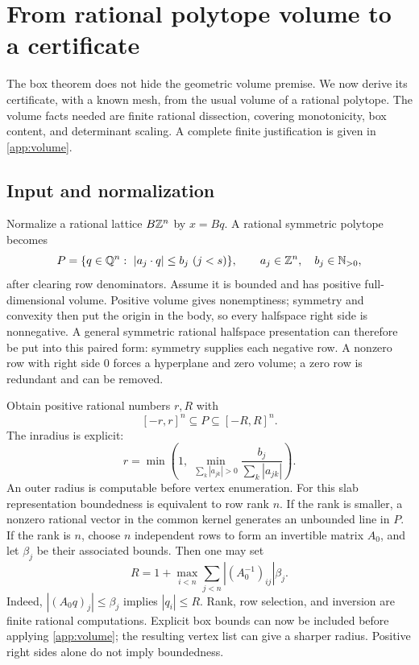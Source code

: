 \section{From rational polytope volume to a certificate}\label{sec:polytope}

The box theorem does not hide the geometric volume premise.
We now derive its certificate, with a known mesh, from the
usual volume of a rational polytope. The volume facts needed
are finite rational dissection, covering monotonicity,
box content, and determinant scaling. A complete finite
justification is given in \cref{app:volume}.

\subsection{Input and normalization}

Normalize a rational lattice \(B\mathbb Z^n\) by \(x=Bq\).
A rational symmetric polytope becomes
\begin{equation}\label{eq:int-poly}
 P=\{q\in\mathbb Q^n:\ |a_j\cdot q|\leq b_j\ (j<s)\},
 \qquad a_j\in\mathbb Z^n,\quad b_j\in\mathbb N_{>0},
\end{equation}
after clearing row denominators. Assume it is bounded and
has positive full-dimensional volume.
Positive volume gives nonemptiness; symmetry and
convexity then put the origin in the body, so every
halfspace right side is nonnegative. A general
symmetric rational halfspace presentation can therefore
be put into this paired form: symmetry supplies each
negative row. A nonzero row with right side \(0\) forces
a hyperplane and zero volume; a zero row is redundant
and can be removed.

Obtain positive rational numbers \(r,R\) with
\begin{equation}\label{eq:radii}
                  [-r,r]^n\subseteq P\subseteq[-R,R]^n.
\end{equation}
The inradius is explicit:
\[
 r=\min\left(1,\ \min_{\sum_k|a_{jk}|>0}
                  \frac{b_j}{\sum_k|a_{jk}|}\right).
\]
An outer radius is computable before vertex enumeration.
For this slab representation boundedness is equivalent
to row rank \(n\). If the rank is smaller, a nonzero
rational vector in the common kernel generates an
unbounded line in \(P\). If the rank is \(n\), choose
\(n\) independent rows to form an invertible matrix
\(A_0\), and let \(\beta_j\) be their associated bounds.
Then one may set
\[
              R=1+\max_{i<n}\sum_{j<n}|(A_0^{-1})_{ij}|\beta_j.
\]
Indeed, \(|(A_0q)_j|\leq\beta_j\) implies
\(|q_i|\leq R\). Rank, row selection, and inversion are
finite rational computations. Explicit box bounds can
now be included before applying \cref{app:volume};
the resulting vertex list can give a sharper radius.
Positive right sides alone do not imply boundedness.

